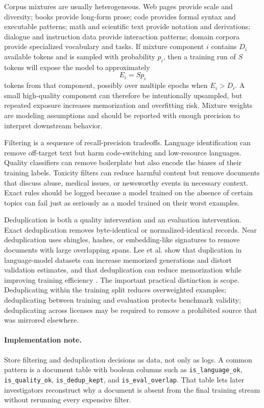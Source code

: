 Corpus mixtures are usually heterogeneous. Web pages provide scale and diversity; books provide long-form prose; code provides formal syntax and executable patterns; math and scientific text provide notation and derivations; dialogue and instruction data provide interaction patterns; domain corpora provide specialized vocabulary and tasks. If mixture component $i$ contains $D_i$ available tokens and is sampled with probability $p_i$, then a training run of $S$ tokens will expose the model to approximately
\begin{equation}
  E_i = S p_i
\end{equation}
tokens from that component, possibly over multiple epochs when $E_i > D_i$. A small high-quality component can therefore be intentionally upsampled, but repeated exposure increases memorization and overfitting risk. Mixture weights are modeling assumptions and should be reported with enough precision to interpret downstream behavior.

Filtering is a sequence of recall-precision tradeoffs. Language identification can remove off-target text but harm code-switching and low-resource languages. Quality classifiers can remove boilerplate but also encode the biases of their training labels. Toxicity filters can reduce harmful content but remove documents that discuss abuse, medical issues, or newsworthy events in necessary context. Exact rules should be logged because a model trained on the absence of certain topics can fail just as seriously as a model trained on their worst examples.

Deduplication is both a quality intervention and an evaluation intervention. Exact deduplication removes byte-identical or normalized-identical records. Near deduplication uses shingles, hashes, or embedding-like signatures to remove documents with large overlapping spans. Lee et al. show that duplication in language-model datasets can increase memorized generations and distort validation estimates, and that deduplication can reduce memorization while improving training efficiency \cite{lee2022deduplicating}. The important practical distinction is scope. Deduplicating within the training split reduces overweighted examples; deduplicating between training and evaluation protects benchmark validity; deduplicating across licenses may be required to remove a prohibited source that was mirrored elsewhere.

\paragraph{Implementation note.}
Store filtering and deduplication decisions as data, not only as logs. A common pattern is a document table with boolean columns such as \texttt{is\_language\_ok}, \texttt{is\_quality\_ok}, \texttt{is\_dedup\_kept}, and \texttt{is\_eval\_overlap}. That table lets later investigators reconstruct why a document is absent from the final training stream without rerunning every expensive filter.

